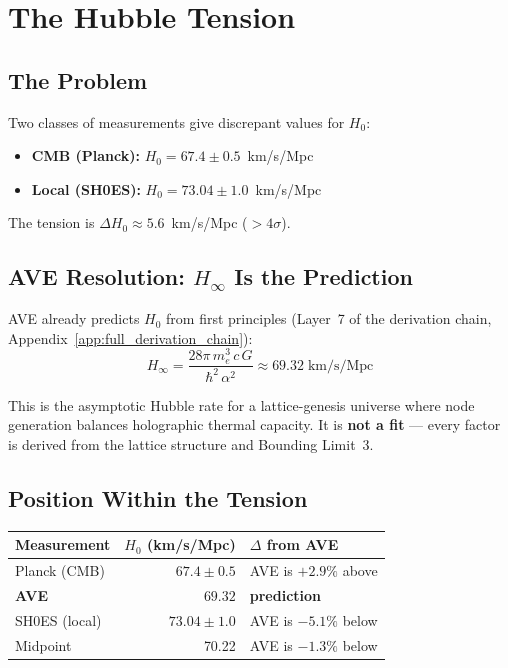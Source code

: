 \section{The Hubble Tension}
\label{sec:hubble_tension}

\subsection{The Problem}

Two classes of measurements give discrepant values for $H_0$:
\begin{itemize}
    \item \textbf{CMB (Planck):} $H_0 = 67.4 \pm 0.5$~km/s/Mpc
    \item \textbf{Local (SH0ES):} $H_0 = 73.04 \pm 1.0$~km/s/Mpc
\end{itemize}
The tension is $\Delta H_0 \approx 5.6$~km/s/Mpc ($>4\sigma$).

\subsection{AVE Resolution: $H_\infty$ Is the Prediction}

AVE already predicts $H_0$ from first principles (Layer~7
of the derivation chain, Appendix~\ref{app:full_derivation_chain}):
\begin{equation}
    \boxed{H_\infty = \frac{28\pi\,m_e^3\,c\,G}{\hbar^2\,\alpha^2}
    \approx 69.32\;\text{km/s/Mpc}}
    \label{eq:H_inf_pred}
\end{equation}

This is the asymptotic Hubble rate for a lattice-genesis universe
where node generation balances holographic thermal capacity.
It is \textbf{not a fit} --- every factor is derived from the
lattice structure and Bounding Limit~3.

\subsection{Position Within the Tension}

\begin{center}
\small
\begin{tabular}{lrl}
\toprule
\textbf{Measurement} & \textbf{$H_0$ (km/s/Mpc)} & \textbf{$\Delta$ from AVE} \\
\midrule
Planck (CMB)   & $67.4 \pm 0.5$  & AVE is $+2.9\%$ above \\
\textbf{AVE}   & $\mathbf{69.32}$ & \textbf{prediction} \\
SH0ES (local)  & $73.04 \pm 1.0$ & AVE is $-5.1\%$ below \\
\midrule
Midpoint       & 70.22           & AVE is $-1.3\%$ below \\
\bottomrule
\end{tabular}
\end{center}

